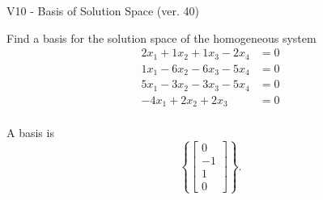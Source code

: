 \begin{exercise}
  \begin{exerciseTitle}V10 - Basis of Solution Space (ver. 40)\end{exerciseTitle}
  \begin{exerciseStatement}
    Find a basis for the solution space of the homogeneous system 
\begin{align*}
 2 x_ 1 + 1 x_ 2 + 1 x_ 3 -2 x_ 4 &= 0  \\ 
  1 x_ 1 -6 x_ 2 -6 x_ 3 -5 x_ 4 &= 0  \\ 
  5 x_ 1 -3 x_ 2 -3 x_ 3 -5 x_ 4 &= 0  \\ 
  -4 x_ 1 + 2 x_ 2 + 2 x_ 3 &= 0  \\ 
 \end{align*}


 
  \end{exerciseStatement}

  \begin{exerciseAnswer}
   A basis is   
\[\left\{\left[\begin{array}{c}
0 \\
-1 \\
1 \\
0
\end{array}\right]\right\}.\]

  


  \end{exerciseAnswer}
\end{exercise}